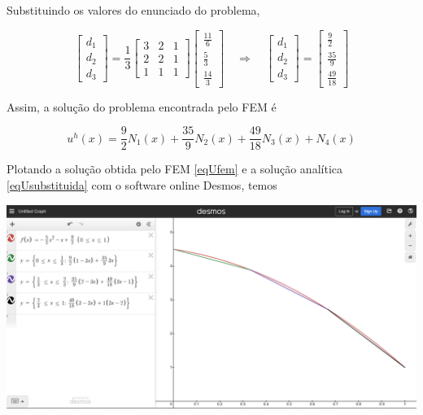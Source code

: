 \documentclass[12pt]{scrartcl}
\newcommand{\logo}{\quad \Rightarrow \quad}
\begin{document}
\endgroup

Substituindo os valores do enunciado do problema,

\begingroup
\renewcommand*{\arraystretch}{2}

\[
    \begin{bmatrix}
        d_1 \\
        d_2 \\
        d_3
    \end{bmatrix} =
    \frac{1}{3}
    \begin{bmatrix}
        3 & 2 & 1 \\
        2 & 2 & 1 \\
        1 & 1 & 1
    \end{bmatrix}
    \begin{bmatrix}
        \frac{11}{6} \\
        \frac{5}{3}  \\
        \frac{14}{3}
    \end{bmatrix}
    \logo
    \begin{bmatrix}
        d_1 \\
        d_2 \\
        d_3
    \end{bmatrix} =
    \begin{bmatrix}
        \frac{9}{2}  \\
        \frac{35}{9} \\
        \frac{49}{18}
    \end{bmatrix}
\]

\endgroup

Assim, a solução do problema encontrada pelo FEM é

\begin{equation}\label{eqUfem}
    \boxed{u^h(x) = \frac{9}{2}N_1(x) + \frac{35}{9}N_2(x) + \frac{49}{18}N_3(x) + N_{4}(x)}
\end{equation}

Plotando a solução obtida pelo FEM \eqref{eqUfem} e a solução analítica \eqref{eqUsubstituida} com o software online Desmos,
temos

\begin{center}
    \includegraphics[scale=0.35]{grafico_ux_AA03.png}
\end{center}
\end{document}
